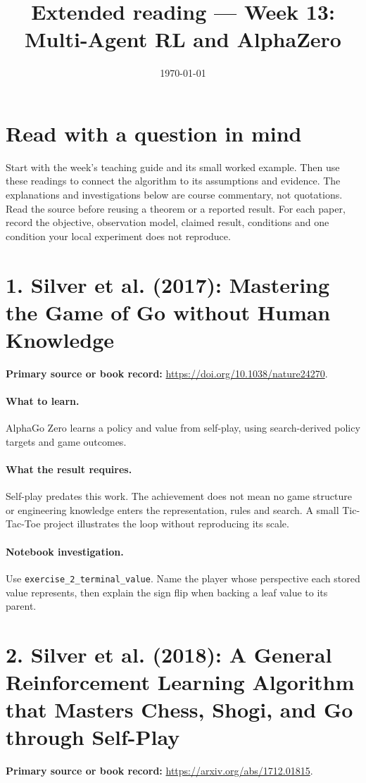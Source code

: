 \documentclass[11pt]{scrartcl}
\title{Extended reading --- Week 13: Multi-Agent RL and AlphaZero}
\date{\today}
\begin{document}
\maketitle
\section*{Read with a question in mind}
Start with the week's teaching guide and its small worked example. Then use
these readings to connect the algorithm to its assumptions and evidence.
The explanations and investigations below are course commentary, not
quotations. Read the source before reusing a theorem or a reported result.
For each paper, record the objective, observation model, claimed result,
conditions and one condition your local experiment does not reproduce.

\section*{1. Silver et al. (2017): Mastering the Game of Go without Human Knowledge}
\textbf{Primary source or book record:} \url{https://doi.org/10.1038/nature24270}.

\paragraph{What to learn.} AlphaGo Zero learns a policy and value from self-play, using search-derived policy targets and game outcomes.

\paragraph{What the result requires.} Self-play predates this work. The achievement does not mean no game structure or engineering knowledge enters the representation, rules and search. A small Tic-Tac-Toe project illustrates the loop without reproducing its scale.

\paragraph{Notebook investigation.} Use \texttt{exercise\_2\_terminal\_value}. Name the player whose perspective each stored value represents, then explain the sign flip when backing a leaf value to its parent.

\section*{2. Silver et al. (2018): A General Reinforcement Learning Algorithm that Masters Chess, Shogi, and Go through Self-Play}
\textbf{Primary source or book record:} \url{https://arxiv.org/abs/1712.01815}.
\end{document}
